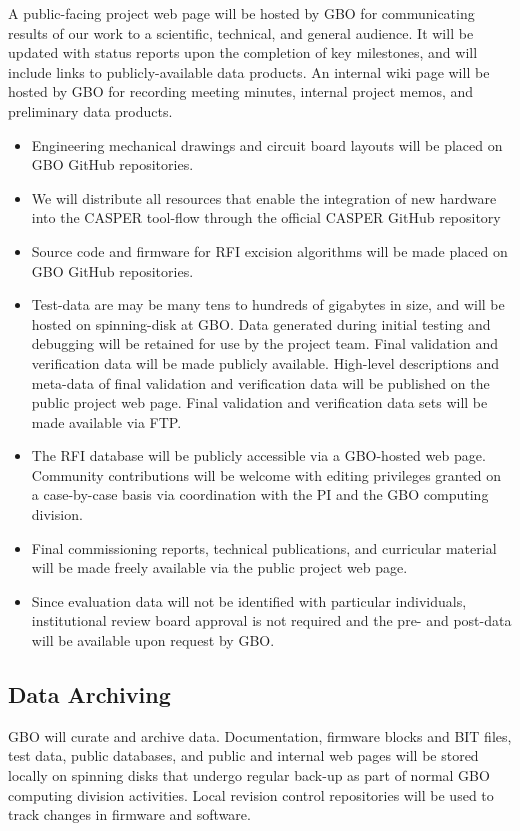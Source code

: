 \documentclass[10pt]{NSF}
\begin{document}
A public-facing project web page will be hosted by GBO for
communicating results of our work to a scientific, technical, and
general audience.  It will be updated with status reports upon the
completion of key milestones, and will include links to
publicly-available data products.  An internal wiki page will be
hosted by GBO for recording meeting minutes, internal project memos,
and preliminary data products.
\begin{itemize}
\item{Engineering mechanical drawings and circuit board layouts will
  be placed on GBO GitHub repositories.}
\item{We will distribute all resources that enable the integration of
  new hardware into the CASPER tool-flow through the official CASPER
  GitHub repository}
\item{Source code and firmware for RFI excision algorithms will be
  made placed on GBO GitHub repositories.}
\item{Test-data are may be many tens to hundreds of gigabytes in size,
  and will be hosted on spinning-disk at GBO.  Data generated during
  initial testing and debugging will be retained for use by the
  project team.  Final validation and verification data will be made
  publicly available.  High-level descriptions and meta-data of final
  validation and verification data will be published on the public
  project web page.  Final validation and verification data sets will
  be made available via FTP.}
\item{The RFI database will be publicly accessible via a GBO-hosted
  web page.  Community contributions will be welcome with editing
  privileges granted on a case-by-case basis via coordination with the
  PI and the GBO computing division.}
\item{Final commissioning reports, technical publications, and
  curricular material will be made freely available via the public
  project web page.}
\item{Since evaluation data will not be identified with particular
  individuals, institutional review board approval is not required and
  the pre- and post-data will be available upon request by GBO.}
\end{itemize}

\subsection{Data Archiving}

GBO will curate and archive data.  Documentation, firmware blocks and
BIT files, test data, public databases, and public and internal
web pages will be stored locally on spinning disks that undergo regular
back-up as part of normal GBO computing division activities.  Local
revision control repositories will be used to track changes in
firmware and software.
\end{document}
